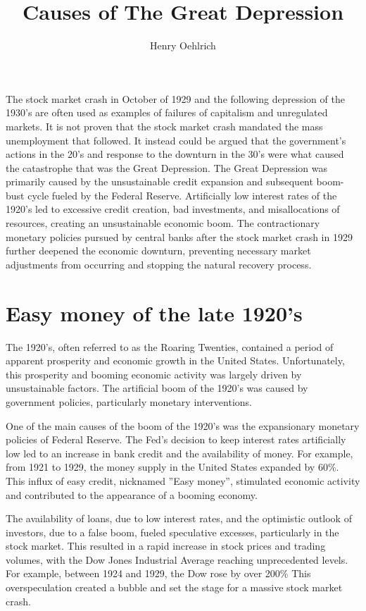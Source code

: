 \documentclass[12pt]{article}
\title{Causes of The Great Depression}
\author{Henry Oehlrich}
\begin{document}
\maketitle{}

The stock market crash in October of 1929 and the following depression of the
1930’s are often used as examples of failures of capitalism and unregulated
markets. It is not proven that the stock market crash mandated the mass
unemployment that followed. It instead could be argued that the government’s
actions in the 20’s and response to the downturn in the 30’s were what caused
the catastrophe that was the Great Depression. The Great Depression was
primarily caused by the unsustainable credit expansion and subsequent boom-bust
cycle fueled by the Federal Reserve. Artificially low interest rates of the
1920's led to excessive credit creation, bad investments, and misallocations of
resources, creating an unsustainable economic boom. The contractionary
monetary policies pursued by central banks after the stock market crash in 1929
further deepened the economic downturn, preventing necessary market adjustments
from occurring and stopping the natural recovery process.

\section{Easy money of the late 1920's}

The 1920's, often referred to as the Roaring Twenties, contained a period of
apparent prosperity and economic growth in the United States. Unfortunately,
this prosperity and booming economic activity was largely driven by
unsustainable factors. The artificial boom of the 1920's was caused by
government policies, particularly monetary interventions.

One of the main causes of the boom of the 1920's was the expansionary monetary
policies of Federal Reserve. The Fed’s decision to keep interest rates
artificially low led to an increase in bank credit and the availability of
money. For example, from 1921 to 1929, the money supply in the United States
expanded by 60\%\autocite{fredmoneysupply}. This influx of easy credit,
nicknamed ”Easy money”, stimulated economic activity and contributed to the
appearance of a booming economy.

The availability of loans, due to low interest rates, and the optimistic
outlook of investors, due to a false boom, fueled speculative excesses,
particularly in the stock market. This resulted in a rapid increase in stock
prices and trading volumes, with the Dow Jones Industrial Average reaching
unprecedented levels. For example, between 1924 and 1929, the Dow rose by over
200\%\autocite{macrotrendsdow} This overspeculation created a bubble and set
the stage for a massive stock market crash.
\end{document}
